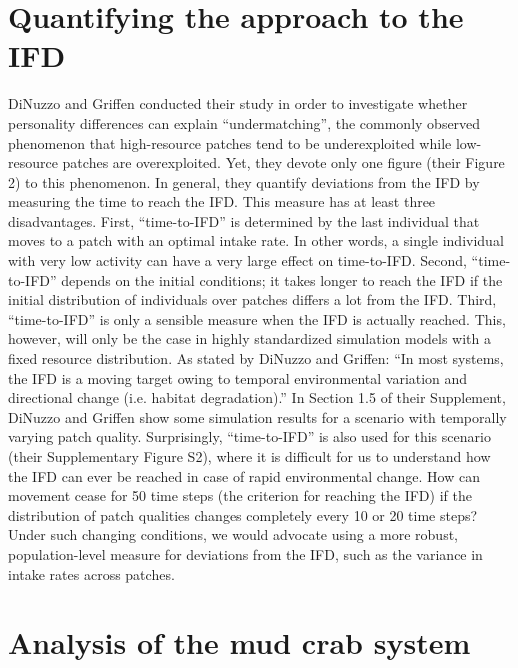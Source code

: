	\section*{Quantifying the approach to the IFD}
	
	DiNuzzo and Griffen conducted their study in order to investigate whether personality differences can explain ``undermatching'', the commonly observed phenomenon that high-resource patches tend to be underexploited while low-resource patches are overexploited.
	Yet, they devote only one figure (their Figure 2) to this phenomenon.
	In general, they quantify deviations from the IFD by measuring the time to reach the IFD.
	This measure has at least three disadvantages.
	First, ``time-to-IFD'' is determined by the last individual that moves to a patch with an optimal intake rate.
	In other words, a single individual with very low activity can have a very large effect on time-to-IFD.
	Second, ``time-to-IFD'' depends on the initial conditions; it takes longer to reach the IFD if the initial distribution of individuals over patches differs a lot from the IFD.
	Third, ``time-to-IFD'' is only a sensible measure when the IFD is actually reached.
	This, however, will only be the case in highly standardized simulation models with a fixed resource distribution.
	As stated by DiNuzzo and Griffen: ``In most systems, the IFD is a moving target owing to temporal environmental variation and directional change (i.e. habitat degradation).'' 
	In Section 1.5 of their Supplement, DiNuzzo and Griffen show some simulation results for a scenario with temporally varying patch quality.
	Surprisingly, ``time-to-IFD'' is also used for this scenario (their Supplementary Figure S2), where it is difficult for us to understand how the IFD can ever be reached in case of rapid environmental change.
	How can movement cease for 50 time steps (the criterion for reaching the IFD) if the distribution of patch qualities changes completely every 10 or 20 time steps? Under such changing conditions, we would advocate using a more robust, population-level measure for deviations from the IFD, such as the variance in intake rates across patches. 
	
	\section*{Analysis of the mud crab system}
	

